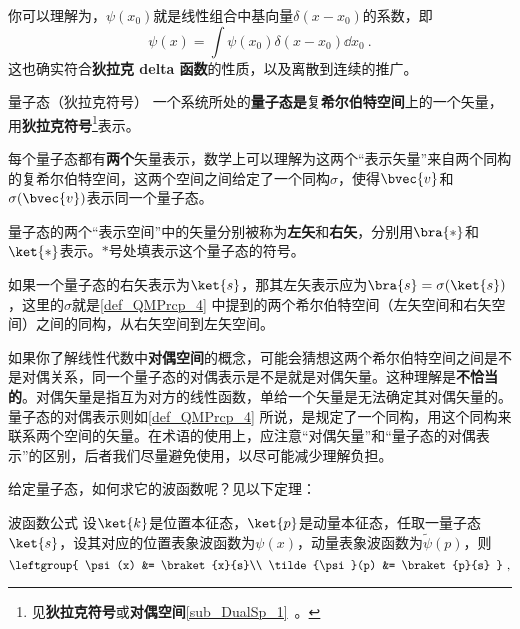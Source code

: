 你可以理解为，$\psi(x_0)$就是线性组合中基向量$\delta(x-x_0)$的系数，即
\begin{equation}\label{eq_QMPrcp_7}
\psi(x) = \int \psi(x_0)\delta(x-x_0)\dd x_0~.
\end{equation}
这也确实符合\textbf{狄拉克 delta 函数}的性质，以及离散到连续的推广。





\begin{definition}{量子态（狄拉克符号）}\label{def_QMPrcp_4}
一个系统所处的\textbf{量子态}\textbf{是}复\textbf{希尔伯特空间}上的一个矢量，用\textbf{狄拉克符号}\footnote{见\textbf{狄拉克符号}或\textbf{对偶空间}\autoref{sub_DualSp_1}~。}表示。

每个量子态都有\textbf{两个}矢量表示，数学上可以理解为这两个“表示矢量”来自两个同构的复希尔伯特空间，这两个空间之间给定了一个同构$\sigma$，使得$\bvec{v}$和$\sigma(\bvec{v})$表示同一个量子态。

量子态的两个“表示空间”中的矢量分别被称为\textbf{左矢}和\textbf{右矢}，分别用$\bra{*}$和$\ket{*}$表示。$*$号处填表示这个量子态的符号。

\end{definition}



如果一个量子态的右矢表示为$\ket{s}$，那其左矢表示应为$\bra{s}=\sigma(\ket{s})$，这里的$\sigma$就是\autoref{def_QMPrcp_4} 中提到的两个希尔伯特空间（左矢空间和右矢空间）之间的同构，从右矢空间到左矢空间。

如果你了解线性代数中\textbf{对偶空间}的概念，可能会猜想这两个希尔伯特空间之间是不是对偶关系，同一个量子态的对偶表示是不是就是对偶矢量。这种理解是\textbf{不恰当的}。对偶矢量是指互为对方的线性函数，单给一个矢量是无法确定其对偶矢量的。量子态的对偶表示则如\autoref{def_QMPrcp_4} 所说，是规定了一个同构，用这个同构来联系两个空间的矢量。在术语的使用上，应注意“对偶矢量”和“量子态的对偶表示”的区别，后者我们尽量避免使用，以尽可能减少理解负担。


给定量子态，如何求它的波函数呢？见以下定理：

\begin{theorem}{波函数公式}
设$\ket{k}$是位置本征态，$\ket{p}$是动量本征态，任取一量子态$\ket{s}$，设其对应的位置表象波函数为$\psi(x)$，动量表象波函数为$\tilde{\psi}(p)$，则
\begin{equation}\label{eq_QMPrcp_8}
\leftgroup{
    \psi(x) &= \braket{x}{s}\\
    \tilde{\psi}(p) &= \braket{p}{s}
}~,
\end{equation}
\end{theorem}

